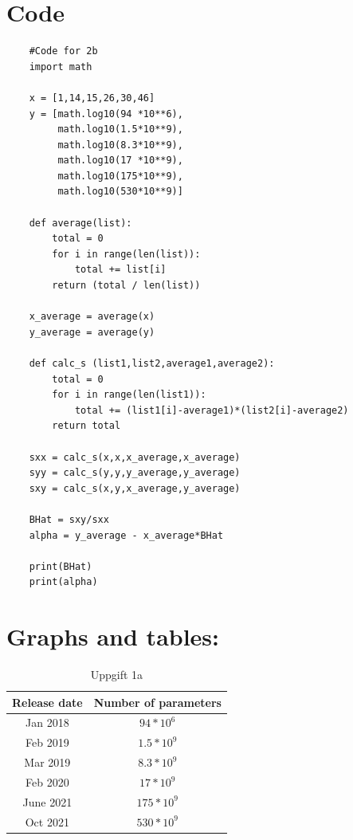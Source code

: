 \documentclass[a4paper]{article}
\begin{document}
\section*{Code}
\begin{lstlisting}
    #Code for 2b
    import math

    x = [1,14,15,26,30,46]
    y = [math.log10(94 *10**6),
         math.log10(1.5*10**9),
         math.log10(8.3*10**9),
         math.log10(17 *10**9),
         math.log10(175*10**9),
         math.log10(530*10**9)]
    
    def average(list):
        total = 0
        for i in range(len(list)):
            total += list[i]
        return (total / len(list))
    
    x_average = average(x)
    y_average = average(y)
    
    def calc_s (list1,list2,average1,average2):
        total = 0
        for i in range(len(list1)):
            total += (list1[i]-average1)*(list2[i]-average2)
        return total
    
    sxx = calc_s(x,x,x_average,x_average)
    syy = calc_s(y,y,y_average,y_average)
    sxy = calc_s(x,y,x_average,y_average)
    
    BHat = sxy/sxx
    alpha = y_average - x_average*BHat
    
    print(BHat)
    print(alpha)
    \end{lstlisting}

\section*{Graphs and tables:}
              \begin{table}[h]
                \centering
                \caption{Uppgift 1a}
                \begin{tabular}{ | c | c |}
                    \hline
                    {\bf Release  date} & {\bf Number of parameters}  \\
                    \hline
                    Jan 2018 & $94*10^6$  \\
                    \hline
                    Feb 2019 & $1.5*10^9$  \\
                    \hline
                    Mar 2019 & $8.3*10^9$  \\
                    \hline
                    Feb 2020 & $17*10^9$  \\
                    \hline
                    June 2021 & $175*10^9$  \\
                    \hline
                    Oct 2021 & $530*10^9$  \\
                    \hline
                \end{tabular}
            \end{table}
\end{document}
